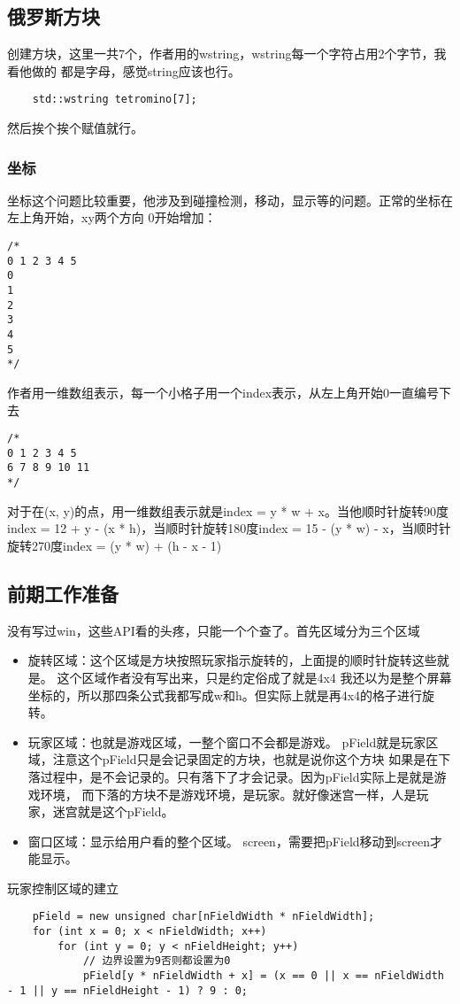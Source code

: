 \documentclass{article}
\begin{document}
\begin{sloppypar}
\subsection{俄罗斯方块}
创建方块，这里一共7个，作者用的wstring，wstring每一个字符占用2个字节，我看他做的
都是字母，感觉string应该也行。
\begin{lstlisting}
	std::wstring tetromino[7];
\end{lstlisting}
然后挨个挨个赋值就行。

\subsubsection{坐标}
坐标这个问题比较重要，他涉及到碰撞检测，移动，显示等的问题。正常的坐标在左上角开始，xy两个方向
0开始增加：
\begin{lstlisting}
/*
0 1 2 3 4 5
0
1
2
3
4
5
*/
\end{lstlisting}
作者用一维数组表示，每一个小格子用一个index表示，从左上角开始0一直编号下去
\begin{lstlisting}
/*
0 1 2 3 4 5
6 7 8 9 10 11
*/
\end{lstlisting}
对于在(x, y)的点，用一维数组表示就是index = y * w + x。当他顺时针旋转90度
index = 12 + y - (x * h)，当顺时针旋转180度index = 15 - (y * w) - x，当顺时针
旋转270度index = (y * w) + (h - x - 1)

\subsection{前期工作准备}
没有写过win，这些API看的头疼，只能一个个查了。首先区域分为三个区域
\begin{itemize}
	\item 旋转区域：这个区域是方块按照玩家指示旋转的，上面提的顺时针旋转这些就是。
	   \subitem 这个区域作者没有写出来，只是约定俗成了就是4x4
	我还以为是整个屏幕坐标的，所以那四条公式我都写成w和h。但实际上就是再4x4的格子进行旋转。
	\item 玩家区域：也就是游戏区域，一整个窗口不会都是游戏。
	   \subitem pField就是玩家区域，注意这个pField只是会记录固定的方块，也就是说你这个方块
	   如果是在下落过程中，是不会记录的。只有落下了才会记录。因为pField实际上是就是游戏环境，
	   而下落的方块不是游戏环境，是玩家。就好像迷宫一样，人是玩家，迷宫就是这个pField。
	\item 窗口区域：显示给用户看的整个区域。
	   \subitem screen，需要把pField移动到screen才能显示。
\end{itemize}
玩家控制区域的建立
\begin{lstlisting}
	pField = new unsigned char[nFieldWidth * nFieldWidth];
    for (int x = 0; x < nFieldWidth; x++)
        for (int y = 0; y < nFieldHeight; y++)
            // 边界设置为9否则都设置为0
            pField[y * nFieldWidth + x] = (x == 0 || x == nFieldWidth - 1 || y == nFieldHeight - 1) ? 9 : 0;
    

\end{lstlisting}
\end{sloppypar}
\end{document}
